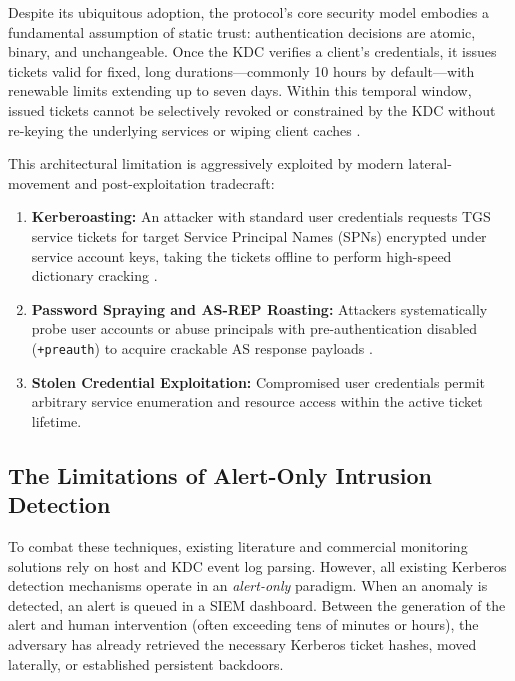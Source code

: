 \documentclass[conference]{IEEEtran}
\begin{document}
Despite its ubiquitous adoption, the protocol's core security model embodies a fundamental assumption of static trust: authentication decisions are atomic, binary, and unchangeable. Once the KDC verifies a client's credentials, it issues tickets valid for fixed, long durations---commonly 10 hours by default---with renewable limits extending up to seven days. Within this temporal window, issued tickets cannot be selectively revoked or constrained by the KDC without re-keying the underlying services or wiping client caches \cite{wiefling2022tops}.

This architectural limitation is aggressively exploited by modern lateral-movement and post-exploitation tradecraft:
\begin{enumerate}
    \item \textbf{Kerberoasting:} An attacker with standard user credentials requests TGS service tickets for target Service Principal Names (SPNs) encrypted under service account keys, taking the tickets offline to perform high-speed dictionary cracking \cite{kotlaba2020icissp}.
    \item \textbf{Password Spraying and AS-REP Roasting:} Attackers systematically probe user accounts or abuse principals with pre-authentication disabled (\texttt{+preauth}) to acquire crackable AS response payloads \cite{grippo2023kerberos}.
    \item \textbf{Stolen Credential Exploitation:} Compromised user credentials permit arbitrary service enumeration and resource access within the active ticket lifetime.
\end{enumerate}

\subsection{The Limitations of Alert-Only Intrusion Detection}
To combat these techniques, existing literature and commercial monitoring solutions rely on host and KDC event log parsing. However, all existing Kerberos detection mechanisms operate in an \textit{alert-only} paradigm. When an anomaly is detected, an alert is queued in a SIEM dashboard. Between the generation of the alert and human intervention (often exceeding tens of minutes or hours), the adversary has already retrieved the necessary Kerberos ticket hashes, moved laterally, or established persistent backdoors.
\end{document}
